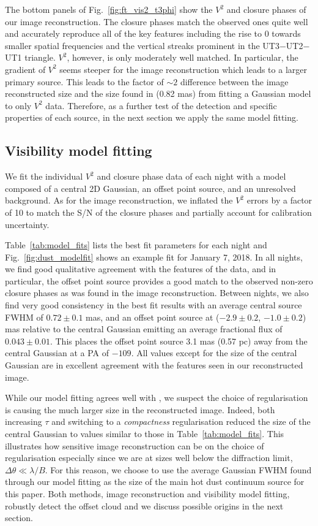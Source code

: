 \documentclass[longauth,]{aa}
\begin{document}
The bottom panels of Fig.~\ref{fig:ft_vis2_t3phi} show the $V^2$ and closure phases of our image reconstruction. The closure phases match the observed ones quite well and accurately reproduce all of the key features including the rise to 0\degree{} towards smaller spatial frequencies and the vertical streaks prominent in the UT3$-$UT2$-$UT1 triangle. $V^2$, however, is only moderately well matched. In particular, the gradient of $V^2$ seems steeper for the image reconstruction which leads to a larger primary source. This leads to the factor of $\sim2$ difference between the image reconstructed size and the size found in  (0.82 mas) from fitting a Gaussian model to only $V^2$ data. Therefore, as a further test of the detection and specific properties of each source, in the next section we apply the same model fitting.

\subsection{Visibility model fitting}

We fit the individual $V^2$ and closure phase data of each night with a model composed of a central 2D Gaussian, an offset point source, and an unresolved background. As for the image reconstruction, we inflated the $V^2$ errors by a factor of 10 to match the S/N of the closure phases and partially account for calibration uncertainty. 

Table~\ref{tab:model_fits} lists the best fit parameters for each night and Fig.~\ref{fig:dust_modelfit} shows an example fit for January 7, 2018. In all nights, we find good qualitative agreement with the features of the data, and in particular, the offset point source provides a good match to the observed non-zero closure phases as was found in the image reconstruction. Between nights, we also find very good consistency in the best fit results with an average central source FWHM of $0.72 \pm 0.1$ mas, and an offset point source at ($-2.9 \pm 0.2$, $-1.0 \pm 0.2$) mas relative to the central Gaussian emitting an average fractional flux of $0.043 \pm 0.01$.  This places the offset point source 3.1 mas (0.57 pc) away from the central Gaussian at a PA of $-109$\degree{}. All values except for the size of the central Gaussian are in excellent agreement with the features seen in our reconstructed image.  

While our model fitting agrees well with , we suspect the choice of regularisation is causing the much larger size in the reconstructed image. Indeed, both increasing $\tau$ and switching to a \textit{compactness} regularisation reduced the size of the central Gaussian to values similar to those in Table~\ref{tab:model_fits}. This illustrates how sensitive image reconstruction can be on the choice of regularisation especially since we are at sizes well below the diffraction limit, $\Delta \theta \ll \lambda/B$. For this reason, we choose to use the average Gaussian FWHM found through our model fitting as the size of the main hot dust continuum source for this paper. Both methods, image reconstruction and visibility model fitting, robustly detect the offset cloud and we discuss possible origins in the next section.  
\end{document}
